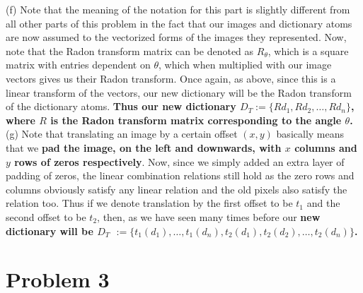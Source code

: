 \documentclass[a4paper,14pt]{article}
\numberwithin{definition}{section}
\numberwithin{mytheorem}{subsection}
\begin{document}
(f) Note that the meaning of the notation for this part is slightly different from all other parts of this problem in the fact that our images and dictionary atoms are now assumed to the vectorized forms of the images they represented. Now, note that the Radon transform matrix can be denoted as $R_{\theta}$, which is a square matrix with entries dependent on $\theta$, which when multiplied with our image vectors gives us their Radon transform. Once again, as above, since this is a linear transform of the vectors, our new dictionary will be the Radon transform of the dictionary atoms. \textbf{Thus our new dictionary $D_T := \{Rd_1, Rd_2, \hdots, Rd_n\}$, where $R$ is the Radon transform matrix corresponding to the angle $\theta$.}\\
(g) Note that translating an image by a certain offset $(x, y)$ basically means that we \textbf{pad the image, on the left and downwards, with $x$ columns and $y$ rows of zeros respectively}. Now, since we simply added an extra layer of padding of zeros, the linear combination relations still hold as the zero rows and columns obviously satisfy any linear relation and the old pixels also satisfy the relation too. Thus if we denote translation by the first offset to be $t_1$ and the second offset to be $t_2$, then, as we have seen many times before our \textbf{new dictionary will be $D_T$
$:= \{t_1(d_1), \hdots, t_1(d_n), t_2(d_1), t_2(d_2), \hdots, t_2(d_n)\}$.}
\section{Problem 3}
\end{document}
